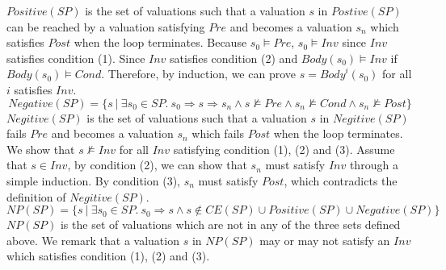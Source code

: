 $\mathit{Positive}(\mathit{SP})$ is the set of valuations such that a valuation $s$ in $\mathit{Postive}(\mathit{SP})$ can be reached by a valuation satisfying $Pre$ and becomes a valuation $s_n$ which satisfies $Post$ when the loop terminates. 
Because $s_0 \models \mathit{Pre}$, $s_0 \models \mathit{Inv}$ since $\mathit{Inv}$ satisfies condition (1). 
Since $\mathit{Inv}$ satisfies condition (2) and $\mathit{Body}(s_0) \models \mathit{Inv}$ if $\mathit{Body}(s_0) \models \mathit{Cond}$.
Therefore, by induction, we can prove $s = \mathit{Body}^i(s_0)$ for all $i$ satisfies $\mathit{Inv}$.
 \[
    \mathit{Negative}(\mathit{SP}) = \{s~|~\exists s_0 \in \mathit{SP}.~s_0 \Rightarrow s \Rightarrow s_n \land s \not \models \mathit{Pre} \land s_n \not \models \mathit{Cond} \land s_n \not \models \mathit{Post}\} \]
$\mathit{Negitive}(\mathit{SP})$ is the set of valuations such that a valuation $s$ in $\mathit{Negitive}(\mathit{SP})$ fails $\mathit{Pre}$ and becomes a valuation $s_n$ which fails $\mathit{Post}$ when the loop terminates. We show that $s \not \models \mathit{Inv}$ for all $\mathit{Inv}$ satisfying condition (1), (2) and (3). Assume that $s \in \mathit{Inv}$, by condition (2), we can show that $s_n$ must satisfy $\mathit{Inv}$ through a simple induction. By condition (3), $s_n$ must satisfy $\mathit{Post}$, which contradicts the definition of $\mathit{Negitive}(\mathit{SP})$.
\[    \mathit{NP}(\mathit{SP}) = \{s~|~\exists s_0 \in \mathit{SP}.~ s_0 \Rightarrow s \land s \not \in \mathit{CE(SP)} \cup \mathit{Positive(SP)} \cup \mathit{Negative(SP)}\}
\]
$\mathit{NP(SP)}$ is the set of valuations which are not in any of the three sets defined above. We remark that a valuation $s$ in $\mathit{NP(SP)}$ may or may not satisfy an $\mathit{Inv}$ which satisfies condition (1), (2) and (3).

